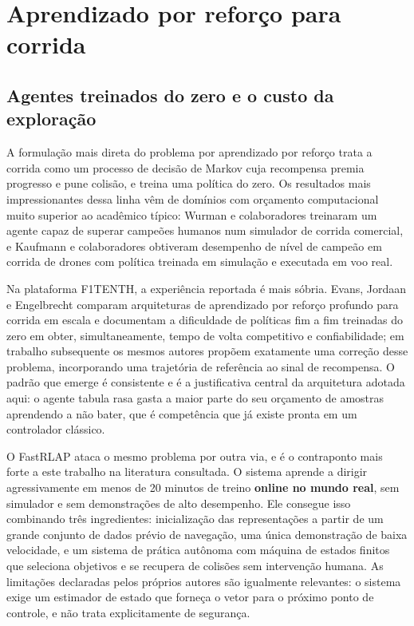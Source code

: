 \section{Aprendizado por reforço para corrida}\label{sec:arte-rl}

\subsection{Agentes treinados do zero e o custo da exploração}

A formulação mais direta do problema por aprendizado por reforço trata a corrida
como um processo de decisão de Markov cuja recompensa premia progresso e pune
colisão, e treina uma política do zero. Os resultados mais impressionantes dessa
linha vêm de domínios com orçamento computacional muito superior ao acadêmico
típico: Wurman e colaboradores \cite{Wurman2022GranTurismo} treinaram um agente
capaz de superar campeões humanos num simulador de corrida comercial, e Kaufmann
e colaboradores \cite{Kaufmann2023DroneRacing} obtiveram desempenho de nível de
campeão em corrida de drones com política treinada em simulação e executada em
voo real.

Na plataforma F1TENTH, a experiência reportada é mais sóbria. Evans, Jordaan e
Engelbrecht \cite{Evans2023Comparing} comparam arquiteturas de aprendizado por
reforço profundo para corrida em escala e documentam a dificuldade de políticas
fim a fim treinadas do zero em obter, simultaneamente, tempo de volta competitivo
e confiabilidade; em trabalho subsequente \cite{Evans2023Trajectory} os mesmos
autores propõem exatamente uma correção desse problema, incorporando uma
trajetória de referência ao sinal de recompensa. O padrão que emerge é
consistente e é a justificativa central da arquitetura adotada aqui: o agente
tabula rasa gasta a maior parte do seu orçamento de amostras aprendendo a não
bater, que é competência que já existe pronta em um controlador clássico.

O FastRLAP \cite{Stachowicz2023FastRLAP} ataca o mesmo problema por outra via, e
é o contraponto mais forte a este trabalho na literatura consultada. O sistema
aprende a dirigir agressivamente em menos de 20 minutos de treino \textbf{online
no mundo real}, sem simulador e sem demonstrações de alto desempenho. Ele
consegue isso combinando três ingredientes: inicialização das representações a
partir de um grande conjunto de dados prévio de navegação, uma única demonstração
de baixa velocidade, e um sistema de prática autônoma com máquina de estados
finitos que seleciona objetivos e se recupera de colisões sem intervenção humana.
As limitações declaradas pelos próprios autores são igualmente relevantes: o
sistema exige um estimador de estado que forneça o vetor para o próximo ponto de
controle, e não trata explicitamente de segurança.

